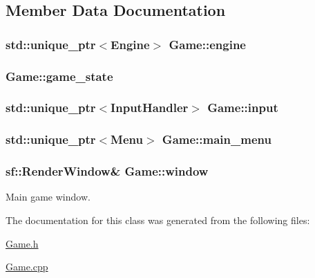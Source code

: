\subsection{Member Data Documentation}
\hypertarget{class_game_aee6b9ebe224001f736e1ed71a3b28223}{}
\subsubsection[{engine}]{\setlength{\rightskip}{0pt plus 5cm}std\+::unique\+\_\+ptr$<${\bf Engine}$>$ Game\+::engine}\label{class_game_aee6b9ebe224001f736e1ed71a3b28223}
\hypertarget{class_game_a12c5a68cb0b0f1ca4bd238824253db7c}{}
\subsubsection[{game\+\_\+state}]{ Game\+::game\+\_\+state}\label{class_game_a12c5a68cb0b0f1ca4bd238824253db7c}
\hypertarget{class_game_a737881663b793b4e7068d60a00937bba}{}
\subsubsection[{input}]{\setlength{\rightskip}{0pt plus 5cm}std\+::unique\+\_\+ptr$<${\bf Input\+Handler}$>$ Game\+::input\hspace{0.3cm}{\ttfamily [private]}}\label{class_game_a737881663b793b4e7068d60a00937bba}
\hypertarget{class_game_ae08cf171b4f973d47def68d69f561e2c}{}
\subsubsection[{main\+\_\+menu}]{\setlength{\rightskip}{0pt plus 5cm}std\+::unique\+\_\+ptr$<${\bf Menu}$>$ Game\+::main\+\_\+menu\hspace{0.3cm}{\ttfamily [private]}}\label{class_game_ae08cf171b4f973d47def68d69f561e2c}
\hypertarget{class_game_ad0fb4d8653dcf289fd6573cf5ba0f3d1}{}
\subsubsection[{window}]{\setlength{\rightskip}{0pt plus 5cm}sf\+::\+Render\+Window\& Game\+::window\hspace{0.3cm}{\ttfamily [private]}}\label{class_game_ad0fb4d8653dcf289fd6573cf5ba0f3d1}


Main game window. 



The documentation for this class was generated from the following files\+:\begin{DoxyCompactItemize}
\item 
\hyperlink{_game_8h}{Game.\+h}\item 
\hyperlink{_game_8cpp}{Game.\+cpp}\end{DoxyCompactItemize}
